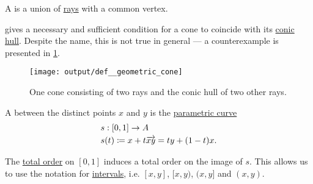 \begin{definition}\label{def:geometric_cone}
  A  is a union of \hyperref[def:geometric_ray]{rays} with a common vertex.

   gives a necessary and sufficient condition for a cone to coincide with its \hyperref[def:conic_hull]{conic hull}. Despite the name, this is not true in general --- a counterexample is presented in \cref{fig:def:geometric_cone}.

  \begin{figure}[!ht]
    \centering
    \texttt{[image: output/def\_\_geometric\_cone]}
    \caption{One cone consisting of two rays and the conic hull of two other rays.}\label{fig:def:geometric_cone}
  \end{figure}
\end{definition}

\begin{definition}\label{def:line_segment}
  A  between the distinct points \( x \) and \( y \) is the \hyperref[def:parametric_curve]{parametric curve}
  \begin{equation*}
    \begin{aligned}
      &s: [0, 1] \to A \\
      &s(t) \coloneqq x + t \overrightarrow{xy} = t y + (1 - t) x.
    \end{aligned}
  \end{equation*}

  The \hyperref[def:totally_ordered_set]{total order} on \( [0, 1] \) induces a total order on the image of \( s \). This allows us to use the notation for \hyperref[def:order_interval]{intervals}, i.e. \( [x, y] \), \( [x, y) \), \( (x, y] \) and \( (x, y) \).
\end{definition}


